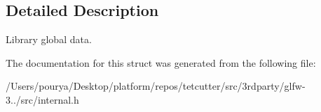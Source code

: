 \subsection{Detailed Description}
Library global data. 

The documentation for this struct was generated from the following file\+:\begin{DoxyCompactItemize}
\item 
/\+Users/pourya/\+Desktop/platform/repos/tetcutter/src/3rdparty/glfw-\/3../src/internal.\+h\end{DoxyCompactItemize}
